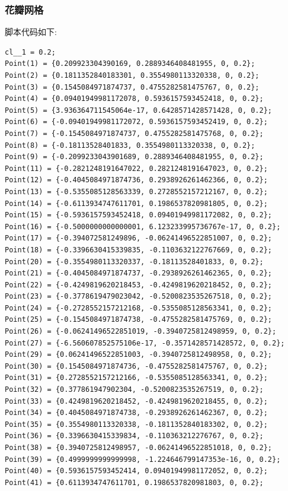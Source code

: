 \documentclass[12pt]{article}
\begin{document}
\begin{CJK}{UTF8}{gkai}
\subsubsection{花瓣网格}
脚本代码如下:\\
\begin{verbatim}
cl__1 = 0.2;
Point(1) = {0.209923304390169, 0.2889346408481955, 0, 0.2};
Point(2) = {0.1811352840183301, 0.3554980113320338, 0, 0.2};
Point(3) = {0.1545084971874737, 0.4755282581475767, 0, 0.2};
Point(4) = {0.09401949981172078, 0.5936157593452418, 0, 0.2};
Point(5) = {3.936364711545064e-17, 0.6428571428571428, 0, 0.2};
Point(6) = {-0.09401949981172072, 0.5936157593452419, 0, 0.2};
Point(7) = {-0.1545084971874737, 0.4755282581475768, 0, 0.2};
Point(8) = {-0.18113528401833, 0.3554980113320338, 0, 0.2};
Point(9) = {-0.2099233043901689, 0.2889346408481955, 0, 0.2};
Point(11) = {-0.2821248191647022, 0.2821248191647023, 0, 0.2};
Point(12) = {-0.4045084971874736, 0.2938926261462366, 0, 0.2};
Point(13) = {-0.5355085128563339, 0.2728552157212167, 0, 0.2};
Point(14) = {-0.6113934747611701, 0.1986537820981805, 0, 0.2};
Point(15) = {-0.5936157593452418, 0.09401949981172082, 0, 0.2};
Point(16) = {-0.5000000000000001, 6.123233995736767e-17, 0, 0.2};
Point(17) = {-0.394072581249896, -0.06241496522851007, 0, 0.2};
Point(18) = {-0.3396630415339835, -0.1103632122767669, 0, 0.2};
Point(20) = {-0.3554980113320337, -0.18113528401833, 0, 0.2};
Point(21) = {-0.4045084971874737, -0.2938926261462365, 0, 0.2};
Point(22) = {-0.4249819620218453, -0.4249819620218452, 0, 0.2};
Point(23) = {-0.3778619479023042, -0.5200823535267518, 0, 0.2};
Point(24) = {-0.2728552157212168, -0.5355085128563341, 0, 0.2};
Point(25) = {-0.1545084971874738, -0.4755282581475769, 0, 0.2};
Point(26) = {-0.06241496522851019, -0.3940725812498959, 0, 0.2};
Point(27) = {-6.560607852575106e-17, -0.3571428571428572, 0, 0.2};
Point(29) = {0.06241496522851003, -0.3940725812498958, 0, 0.2};
Point(30) = {0.1545084971874736, -0.4755282581475767, 0, 0.2};
Point(31) = {0.2728552157212166, -0.5355085128563341, 0, 0.2};
Point(32) = {0.377861947902304, -0.5200823535267519, 0, 0.2};
Point(33) = {0.4249819620218452, -0.4249819620218455, 0, 0.2};
Point(34) = {0.4045084971874738, -0.2938926261462367, 0, 0.2};
Point(35) = {0.3554980113320338, -0.1811352840183302, 0, 0.2};
Point(36) = {0.3396630415339834, -0.110363212276767, 0, 0.2};
Point(38) = {0.3940725812498957, -0.06241496522851018, 0, 0.2};
Point(39) = {0.4999999999999998, -1.224646799147353e-16, 0, 0.2};
Point(40) = {0.5936157593452414, 0.09401949981172052, 0, 0.2};
Point(41) = {0.6113934747611701, 0.1986537820981803, 0, 0.2};

\end{verbatim}
\end{CJK}
\end{document}
